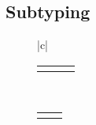 








\subsection{Subtyping}

\begin{figure}[!t]
  \begin{center}
    \def\arraystretch{2}
    \begin{tabular}{|c|}\hline
      \begin{tabular}{ccc}
        \AxiomC{$_A^B X^L, \Gamma\ \vdash\ T \leq S$}
        \UnaryInfC{$\Gamma\ \vdash\ \exists$ $_A^B X . T\ \leq\ S$}
        \DisplayProof

        \hspace{3ex}

        &

        \AxiomC{$_A^BX^R, \Gamma\ \vdash\ T \leq S$}
        \UnaryInfC{$\Gamma\ \vdash\ T\ \leq\ \exists$ $_A^B X . S$}
        \DisplayProof

        \hspace{3ex}

        &

        \AxiomC{}
        \UnaryInfC{$\Gamma\ \vdash\ X \leq X$}
        \DisplayProof
      \end{tabular}

      \\[8pt]

      \begin{tabular}{cc}
        \AxiomC{$^BX^L,\Gamma\ \vdash\ B \leq T$}
        \UnaryInfC{$^BX^L,\Gamma\ \vdash\ X \leq T$}
        \DisplayProof

        \hspace{3ex}

        &

        \AxiomC{$_AX^L,\Gamma\ \vdash\ T \leq A$}
        \UnaryInfC{$_AX^L,\Gamma\ \vdash\ T \leq X$}
        \DisplayProof

        \hspace{3ex}


\end{tabular}
\end{tabular}
\end{center}
\end{figure}
